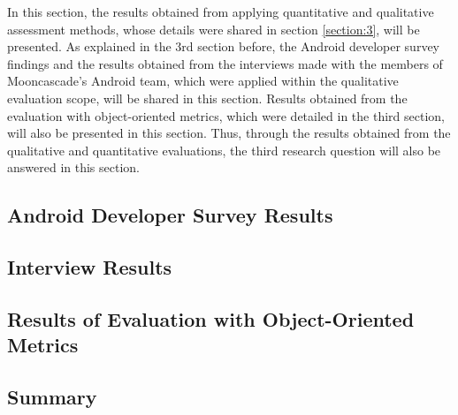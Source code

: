 In this section, the results obtained from applying quantitative and qualitative assessment methods, whose details were shared in section \ref{section:3}, will be presented. As explained in the 3rd section before, the Android developer survey findings and the results obtained from the interviews made with the members of Mooncascade's Android team, which were applied within the qualitative evaluation scope, will be shared in this section. Results obtained from the evaluation with object-oriented metrics, which were detailed in the third section, will also be presented in this section. Thus, through the results obtained from the qualitative and quantitative evaluations, the third research question will also be answered in this section.

\subsection{Android Developer Survey Results}


\subsection{Interview Results}


\subsection{Results of Evaluation with Object-Oriented Metrics}
\label{section:5.3}


\subsection{Summary}

